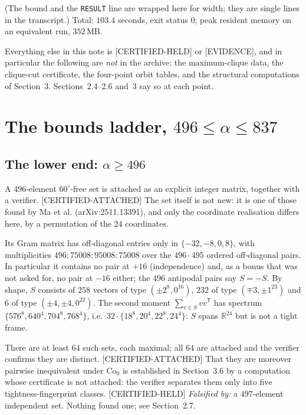 \documentclass[10pt,a4paper]{article}
\newcommand{\CA}{\textsf{[CERTIFIED-ATTACHED]}}
\newcommand{\CH}{\textsf{[CERTIFIED-HELD]}}
\newcommand{\EV}{\textsf{[EVIDENCE]}}
\newcommand{\Co}{\mathrm{Co}_0}
\begin{document}
\noindent
(The bound and the \texttt{RESULT} line are wrapped here for width; they are single lines in the
transcript.) Total: $103.4$ seconds, exit status $0$; peak resident memory on an equivalent
run, $352$\,MB.

Everything else in this note is \CH{} or \EV{}, and in particular the following are \emph{not} in
the archive: the maximum-clique data, the clique-cut certificate, the four-point orbit tables, and
the structural computations of Section~3. Sections~2.4--2.6 and~3 say so at each point.

\section{The bounds ladder, $496 \le \alpha \le 837$}

\subsection{The lower end: $\alpha \ge 496$}\label{sec:lower}

A $496$-element $60^\circ$-free set is attached as an explicit integer matrix, together with a
verifier. \CA{} The set itself is not new: it is one of those found by Ma et al.
(arXiv:2511.13391), and only the coordinate realisation differs here, by a permutation of the
$24$ coordinates.

Its Gram matrix has off-diagonal entries only in $\{-32,-8,0,8\}$, with multiplicities
$496 : 75008 : 95008 : 75008$ over the $496\cdot 495$ ordered off-diagonal pairs. In particular
it contains no pair at $+16$ (independence) and, as a bonus that was not asked for, no pair at
$-16$ either; the $496$ antipodal pairs say $S = -S$. By shape, $S$ consists of $258$ vectors of
type $(\pm 2^8, 0^{16})$, $232$ of type $(\mp 3, \pm 1^{23})$ and $6$ of type
$(\pm 4, \pm 4, 0^{22})$. The second moment $\sum_{v \in S} vv^{\mathsf T}$ has spectrum
$\{576^8, 640^4, 704^8, 768^4\}$, i.e.\ $32\cdot\{18^8,20^4,22^8,24^4\}$: $S$ spans
$\mathbb{R}^{24}$ but is not a tight frame.

There are at least $64$ such sets, each maximal; all $64$ are attached and the verifier
confirms they are distinct. \CA{} That they are moreover pairwise inequivalent under $\Co$
is established in Section~3.6 by a computation whose certificate is not attached: the
verifier separates them only into five tightness-fingerprint classes. \CH{}
\emph{Falsified by:} a $497$-element independent set. Nothing found one; see Section~2.7.
\end{document}
